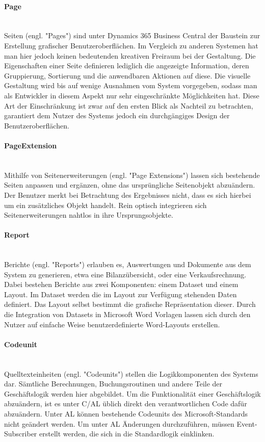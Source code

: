 \paragraph{Page}\mbox{}\\
Seiten (engl. "Pages") sind unter Dynamics 365 Business Central der Baustein zur Erstellung grafischer Benutzeroberflächen. Im Vergleich zu anderen Systemen hat man hier jedoch keinen bedeutenden kreativen Freiraum bei der Gestaltung. Die Eigenschaften einer Seite definieren lediglich die angezeigte Information, deren Gruppierung, Sortierung und die anwendbaren Aktionen auf diese. Die visuelle Gestaltung wird bis auf wenige Ausnahmen vom System vorgegeben, sodass man als Entwickler in diesem Aspekt nur sehr eingeschränkte Möglichkeiten hat. Diese Art der Einschränkung ist zwar auf den ersten Blick als Nachteil zu betrachten, garantiert dem Nutzer des Systems jedoch ein durchgängiges Design der Benutzeroberflächen.

\paragraph{PageExtension}\mbox{}\\
Mithilfe von Seitenerweiterungen (engl. "Page Extensions") lassen sich bestehende Seiten anpassen und ergänzen, ohne das ursprüngliche Seitenobjekt abzuändern. Der Benutzer merkt bei Betrachtung des Ergebnisses nicht, dass es sich hierbei um ein zusätzliches Objekt handelt. Rein optisch integrieren sich Seitenerweiterungen nahtlos in ihre Ursprungsobjekte.

\paragraph{Report}\mbox{}\\
Berichte (engl. "Reports") erlauben es, Auswertungen und Dokumente aus dem System zu generieren, etwa eine Bilanzübersicht, oder eine Verkaufsrechnung. Dabei bestehen Berichte aus zwei Komponenten: einem Dataset und einem Layout. Im Dataset werden die im Layout zur Verfügung stehenden Daten definiert. Das Layout selbst bestimmt die grafische Repräsentation dieser. Durch die Integration von Datasets in Microsoft Word Vorlagen lassen sich durch den Nutzer auf einfache Weise benutzerdefinierte Word-Layouts erstellen.

\paragraph{Codeunit}\mbox{}\\
Quelltexteinheiten (engl. "Codeunits") stellen die Logikkomponenten des Systems dar. Sämtliche Berechnungen, Buchungsroutinen und andere Teile der Geschäftslogik werden hier abgebildet. Um die Funktionalität einer Geschäftslogik abzuändern, ist es unter C/AL üblich direkt den verantwortlichen Code dafür abzuändern. Unter AL können bestehende Codeunits des Microsoft-Standards nicht geändert werden. Um unter AL Änderungen durchzuführen, müssen Event-Subscriber erstellt werden, die sich in die Standardlogik einklinken. 

